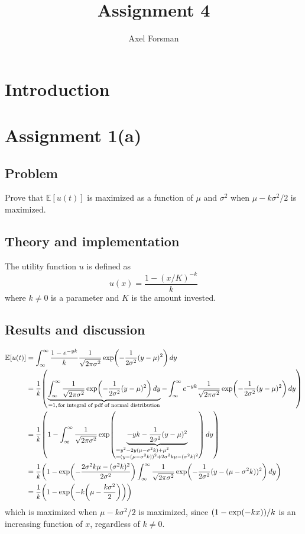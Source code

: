 \documentclass[11pt, a4paper]{article}
\title{Assignment 4}
\author{Axel Forsman}
\let\originalleft\left
\let\originalright\right
\renewcommand{\left}{\mathopen{}\mathclose\bgroup\originalleft}
\renewcommand{\right}{\aftergroup\egroup\originalright}
\begin{document}
\maketitle

\section{Introduction}

\section{Assignment 1(a)}\label{sec:max_proof}
\subsection{Problem}
Prove that $\mathbb E[u(t)]$ is maximized as a function of
$\mu$ and $\sigma^2$ when $\mu - k\sigma^2/2$ is maximized.
\subsection{Theory and implementation}
The utility function $u$ is defined as
\begin{equation}\label{eq:utility}
u(x) = \frac{1 - (x / K)^{-k}}k
\end{equation}
where $k \neq 0$ is a parameter and $K$ is the amount invested.
\subsection{Results and discussion}
\begin{align*}
	\mathbb E[u(t)] &= \int_\infty^\infty \frac{1 - e^{-yk}}k \frac1{\sqrt{2\pi\sigma^2}}
		\exp\left(-\frac1{2\sigma^2} (y - \mu)^2\right) \, dy \\
		&= \frac1k \left(\underbrace{\int_\infty^\infty \frac1{\sqrt{2\pi\sigma^2}} \exp\left(-\frac1{2\sigma^2} (y - \mu)^2\right) \, dy}_{=1, \, \text{for integral of pdf of normal distribution}}
		- \int_\infty^\infty e^{-yk} \frac1{\sqrt{2\pi\sigma^2}} \exp\left(-\frac1{2\sigma^2} (y - \mu)^2\right) \, dy\right) \\
		&= \frac1k \left(1 - \int_\infty^\infty \frac1{\sqrt{2\pi\sigma^2}}
			\exp\left(\underbrace{-yk - \frac1{2\sigma^2} (y - \mu)^2}_{\begin{subarray}{1}
				= y^2 - 2y(\mu - \sigma^2k) + \mu^2 \\
				= (y - (\mu - \sigma^2k))^2 + 2\sigma^2k\mu - (\sigma^2k)^2
			\end{subarray}}\right) \, dy\right) \\
		&= \frac1k \left(1 - \exp\left(-\frac{2\sigma^2k\mu - (\sigma^2k)^2}{2\sigma^2}\right)
			\int_\infty^\infty \frac1{\sqrt{2\pi\sigma^2}} \exp\left(-\frac1{2\sigma^2} (y - (\mu - \sigma^2k))^2\right) \, dy\right) \\
		&= \frac1k \left(1 - \exp\left(-k \left(\mu - \frac{k\sigma^2}2\right)\right)\right)
\end{align*}
which is maximized when $\mu - k\sigma^2/2$ is maximized, since
$\left(1 - \exp\left(-k x\right)\right) / k$
is an increasing function of $x$, regardless of $k \ne 0$.
\end{document}
